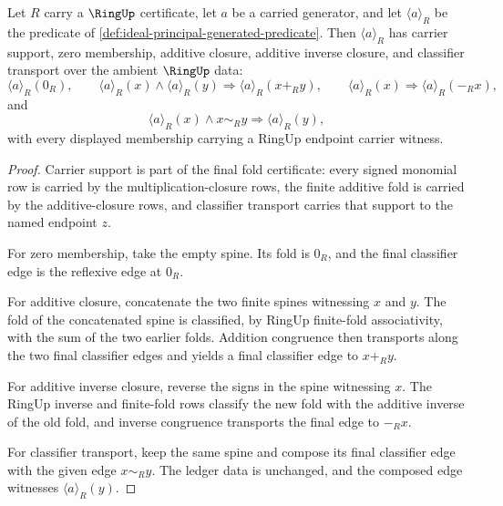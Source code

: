 \begin{theorem}
\label{thm:ideal-principal-generated-subtractive-closure}
Let $R$ carry a $\RingUp$ certificate, let $a$ be a carried generator, and let $\langle a\rangle_R$ be the predicate of \autoref{def:ideal-principal-generated-predicate}. Then $\langle a\rangle_R$ has carrier support, zero membership, additive closure, additive inverse closure, and classifier transport over the ambient $\RingUp$ data:
$$
\langle a\rangle_R(0_R),\qquad
\langle a\rangle_R(x)\land \langle a\rangle_R(y)\Longrightarrow \langle a\rangle_R(x+_R y),\qquad
\langle a\rangle_R(x)\Longrightarrow \langle a\rangle_R(-_R x),
$$
and
$$
\langle a\rangle_R(x)\land x\sim_R y\Longrightarrow \langle a\rangle_R(y),
$$
with every displayed membership carrying a RingUp endpoint carrier witness.
\end{theorem}
\begin{proof}
Carrier support is part of the final fold certificate: every signed monomial row is carried by the multiplication-closure rows, the finite additive fold is carried by the additive-closure rows, and classifier transport carries that support to the named endpoint $z$.

For zero membership, take the empty spine. Its fold is $0_R$, and the final classifier edge is the reflexive edge at $0_R$.

For additive closure, concatenate the two finite spines witnessing $x$ and $y$. The fold of the concatenated spine is classified, by RingUp finite-fold associativity, with the sum of the two earlier folds. Addition congruence then transports along the two final classifier edges and yields a final classifier edge to $x+_R y$.

For additive inverse closure, reverse the signs in the spine witnessing $x$. The RingUp inverse and finite-fold rows classify the new fold with the additive inverse of the old fold, and inverse congruence transports the final edge to $-_R x$.

For classifier transport, keep the same spine and compose its final classifier edge with the given edge $x\sim_R y$. The ledger data is unchanged, and the composed edge witnesses $\langle a\rangle_R(y)$.
\end{proof}

